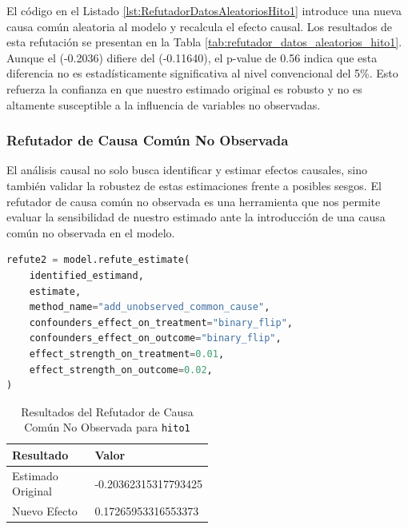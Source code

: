 El código en el Listado \ref{lst:RefutadorDatosAleatoriosHito1} introduce una nueva causa común aleatoria al modelo y recalcula el efecto causal. Los resultados de esta refutación se presentan en la Tabla \ref{tab:refutador_datos_aleatorios_hito1}. Aunque el  (-0.2036) difiere del  (-0.11640), el p-value de 0.56 indica que esta diferencia no es estadísticamente significativa al nivel convencional del 5\%. Esto refuerza la confianza en que nuestro estimado original es robusto y no es altamente susceptible a la influencia de variables no observadas.



\subsubsection{Refutador de Causa Común No Observada}

El análisis causal no solo busca identificar y estimar efectos causales, sino también validar la robustez de estas estimaciones frente a posibles sesgos. El refutador de causa común no observada es una herramienta que nos permite evaluar la sensibilidad de nuestro estimado ante la introducción de una causa común no observada en el modelo.

\begin{minipage}{0.5\textwidth}
    \begin{lstlisting}[language=Python, caption=Refutador de causa común no observada para \texttt{hito1}, label=lst:RefutadorCausaComúnNoObservadaHito1]
refute2 = model.refute_estimate(
    identified_estimand,
    estimate,
    method_name="add_unobserved_common_cause",
    confounders_effect_on_treatment="binary_flip",
    confounders_effect_on_outcome="binary_flip",
    effect_strength_on_treatment=0.01,
    effect_strength_on_outcome=0.02,
)
\end{lstlisting}
\end{minipage}
\hfill
\begin{minipage}{0.45\textwidth}
    \begin{table}[H]
        \centering
        \begin{tabular}{lp{0.5\linewidth}}
            \toprule
            \textbf{Resultado} & \textbf{Valor} \\
            \midrule
            Estimado Original & -0.20362315317793425 \\
            Nuevo Efecto & 0.17265953316553373 \\
            \bottomrule
        \end{tabular}
        \caption{Resultados del Refutador de Causa Común No Observada para \texttt{hito1}}
        \label{tab:refutador_causa_no_observada_hito1}
    \end{table}
\end{minipage}

